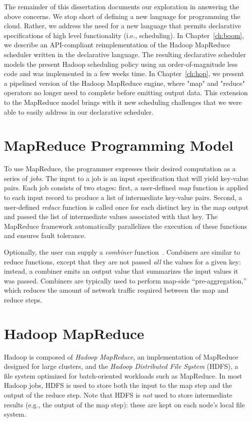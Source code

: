 The remainder of this dissertation documents our exploration in answering the above concerns. We stop
short of defining a new language for programming the cloud. Rather, we address the need for a new language
that permits declarative specifications of high level functionality (i.e., scheduling). 
In Chapter~\ref{ch:boom}, we describe an API-compliant reimplementation of the Hadoop 
MapReduce scheduler written in the \OVERLOG declarative language. The resulting declarative scheduler
models the present Hadoop scheduling policy using an order-of-magnitude less code and was implemented in
a few weeks time. In Chapter~\ref{ch:hop}, we present a pipelined version of the Hadoop MapReduce engine, 
where "map" and "reduce" operators no longer need to complete before emitting output data. This extension to 
the MapReduce model brings with it new scheduling challenges that we were able to easily address in our 
declarative scheduler.

\section{MapReduce Programming Model}
\label{ch:mrback:sec:progmodel}
To use MapReduce, the programmer expresses their desired computation as a series
of \emph{jobs}. The input to a job is an input specification that will yield
key-value pairs. Each job consists of two stages: first, a user-defined
\emph{map} function is applied to each input record to produce a list of
intermediate key-value pairs. Second, a user-defined \emph{reduce} function is
called once for each distinct key in the map output and passed the list of
intermediate values associated with that key.  The MapReduce framework
automatically parallelizes the execution of these functions and ensures fault
tolerance.

Optionally, the user can supply a \emph{combiner}
function~\cite{mapreduce-osdi}. Combiners are similar to reduce functions,
except that they are not passed \emph{all} the values for a given key: instead,
a combiner emits an output value that summarizes the input values it was
passed. Combiners are typically used to perform map-side ``pre-aggregation,''
which reduces the amount of network traffic required between the map and reduce
steps.

\section{Hadoop MapReduce}
Hadoop is composed of \emph{Hadoop MapReduce}, an implementation of
MapReduce designed for large clusters, and the \emph{Hadoop
  Distributed File System} (HDFS), a file system optimized for
batch-oriented workloads such as MapReduce. In most Hadoop jobs, HDFS
is used to store both the input to the map step and the output of the
reduce step. Note that HDFS is \emph{not} used to store intermediate
results (e.g., the output of the map step): these are kept on each
node's local file system.

